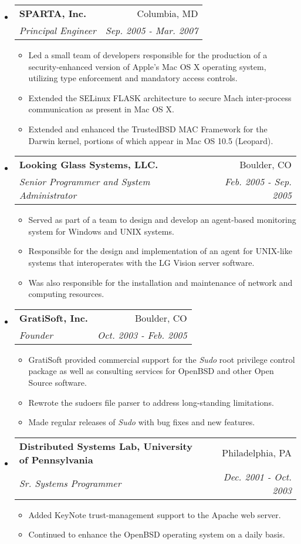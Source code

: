 \documentclass[letterpaper,11pt]{article}
\makeatletter
\newcommand{\resitem}[1]{\item #1 \vspace{-2pt}}
\newcommand{\ressubheading}[4]{
\begin{tabular*}{7.0in}{l@{\extracolsep{\fill}}r}
		\textbf{#1} & #2 \\
		\textit{#3} & \textit{#4} \\
\end{tabular*}\vspace{-6pt}}
\makeatother
\begin{document}
\begin{itemize}
\pagebreak

\item
	\ressubheading{SPARTA, Inc.}{Columbia, MD}{Principal Engineer}{Sep. 2005 - Mar. 2007}
	\begin{itemize}
		\resitem{Led a small team of developers responsible for the production of a security-enhanced version of Apple's Mac OS X operating system, utilizing type enforcement and mandatory access controls.}
		\resitem{Extended the SELinux FLASK architecture to secure Mach inter-process communication as present in Mac OS X.}
		\resitem{Extended and enhanced the TrustedBSD MAC Framework for the Darwin kernel, portions of which appear in Mac OS 10.5 (Leopard).}
	\end{itemize}

\item
	\ressubheading{Looking Glass Systems, LLC.}{Boulder, CO}{Senior Programmer and System Administrator}{Feb. 2005 - Sep. 2005}
	\begin{itemize}
		\resitem{Served as part of a team to design and develop an agent-based monitoring system for Windows and {\sc UNIX} systems.}
		\resitem{Responsible for the design and implementation of an agent for UNIX-like systems that interoperates with the LG Vision server software.}
		\resitem{Was also responsible for the installation and maintenance of network and computing resources.}
	\end{itemize}

\item
	\ressubheading{GratiSoft, Inc.}{Boulder, CO}{Founder}{Oct. 2003 - Feb. 2005}
	\begin{itemize}
		\resitem{GratiSoft provided commercial support for the \emph{Sudo} root privilege control package as well as consulting services for OpenBSD and other Open Source software.}
		\resitem{Rewrote the sudoers file parser to address long-standing limitations.}
		\resitem{Made regular releases of \emph{Sudo} with bug fixes and new features.}
	\end{itemize}

\item
	\ressubheading{Distributed Systems Lab, University of Pennsylvania}{Philadelphia, PA}{Sr. Systems Programmer}{Dec. 2001 - Oct. 2003}
	\begin{itemize}
		\resitem{Added KeyNote trust-management support to the Apache web server.}
		\resitem{Continued to enhance the OpenBSD operating system on a daily basis.}
	\end{itemize}


\end{itemize}
\end{document}
